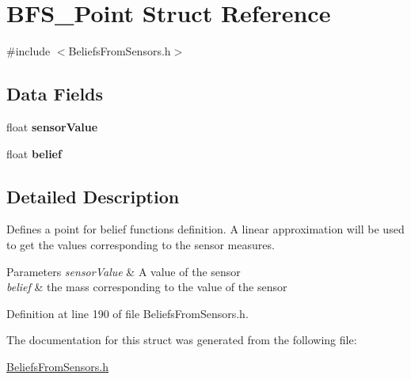 \hypertarget{struct_b_f_s___point}{
\section{BFS\_\-Point Struct Reference}
\label{struct_b_f_s___point}
}


{\ttfamily \#include $<$BeliefsFromSensors.h$>$}

\subsection*{Data Fields}
\begin{DoxyCompactItemize}
\item 
\hypertarget{struct_b_f_s___point_a5b89170903f5d655f0e21e500138425b}{
float {\bfseries sensorValue}}
\label{struct_b_f_s___point_a5b89170903f5d655f0e21e500138425b}

\item 
\hypertarget{struct_b_f_s___point_a6e4486fe342cdfe9f04042b551e1651e}{
float {\bfseries belief}}
\label{struct_b_f_s___point_a6e4486fe342cdfe9f04042b551e1651e}

\end{DoxyCompactItemize}


\subsection{Detailed Description}
Defines a point for belief functions definition. A linear approximation will be used to get the values corresponding to the sensor measures. 
\begin{DoxyParams}{Parameters}
{\em sensorValue} & A value of the sensor \\
\hline
{\em belief} & the mass corresponding to the value of the sensor \\
\hline
\end{DoxyParams}


Definition at line 190 of file BeliefsFromSensors.h.



The documentation for this struct was generated from the following file:\begin{DoxyCompactItemize}
\item 
\hyperlink{_beliefs_from_sensors_8h}{BeliefsFromSensors.h}\end{DoxyCompactItemize}
